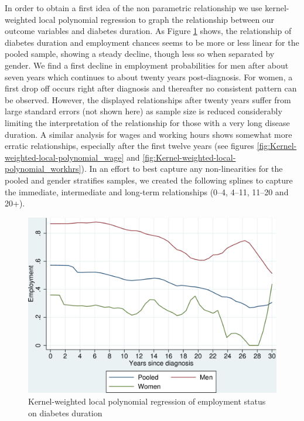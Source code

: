 \documentclass[12pt,english,british]{article}
\begin{document}
In order to obtain a first idea of the non parametric relationship
we use kernel-weighted local polynomial regression to graph the relationship
between our outcome variables and diabetes duration. As Figure \ref{fig:Kernel-weighted-local-polynomial_empl}
shows, the relationship of diabetes duration and employment chances
seems to be more or less linear for the pooled sample, showing a steady
decline, though less so when separated by gender. We find a first
decline in employment probabilities for men after about seven years
which continues to about twenty years post-diagnosis. For women,
a first drop off occurs right after diagnosis and thereafter no consistent
pattern can be observed. However, the displayed relationships after
twenty years suffer from large standard errors (not shown here) as sample size is reduced
considerably limiting the interpretation of the relationship for those with a very long disease duration. A similar analysis for wages and working hours shows
somewhat more erratic relationships, especially after the first twelve
years (see figures \ref{fig:Kernel-weighted-local-polynomial_wage} and \ref{fig:Kernel-weighted-local-polynomial_workhrs}). In an effort to best capture any non-linearities for the pooled
and gender stratifies samples, we created the following splines to
capture the immediate, intermediate and long-term relationships (0--4,
4--11, 11--20 and 20+).   
  

\begin{figure}[h!]
\caption{\label{fig:Kernel-weighted-local-polynomial_empl}Kernel-weighted local
polynomial regression of employment status on diabetes duration}%
\begin{center}
\includegraphics[width=0.7\columnwidth]{figures/lpoly_works_diabetesduration/lpoly_works_diabetesduration}
\end{center}
\end{figure}
\end{document}
